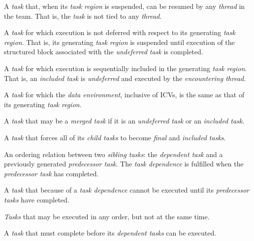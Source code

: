 \glossarydefstart
A \emph{task} that, when its \emph{task region} is suspended, can be resumed 
by any \emph{thread} in the team. That is, the \emph{task} is not tied to 
any \emph{thread}.
\glossarydefend

\glossarydefstart
A \emph{task} for which execution is not deferred with respect to its 
generating \emph{task} \emph{region}. That is, its generating \emph{task}
\emph{region} is suspended until execution of the structured block associated 
with the \emph{undeferred} \emph{task} is completed.
\glossarydefend

\glossarydefstart
A \emph{task} for which execution is sequentially included in the 
generating \emph{task region}. That is, an \emph{included task} is 
\emph{undeferred} and executed by the \emph{encountering thread}.
\glossarydefend

\glossarydefstart
A \emph{task} for which the \emph{data environment}, inclusive of ICVs, 
is the same as that of its generating \emph{task region}.
\glossarydefend

\glossarydefstart
A \emph{task} that may be a \emph{merged task} if it is an 
\emph{undeferred task} or an \emph{included task}.
\glossarydefend

\glossarydefstart
A \emph{task} that forces all of its \emph{child tasks} to become 
\emph{final} and \emph{included tasks}.
\glossarydefend

\glossarydefstart
An ordering relation between two \emph{sibling tasks}: the 
\emph{dependent task} and a previously generated \emph{predecessor task}. 
The \emph{task dependence} is fulfilled when the
\emph{predecessor task} has completed.
\glossarydefend

\begin{samepage}
\glossarydefstart
A \emph{task} that because of a \emph{task dependence} cannot be executed 
until its \emph{predecessor tasks} have completed.
\glossarydefend
\end{samepage}

\glossarydefstart
\emph{Tasks} that may be executed in any order, but not at the same time.
\glossarydefend
\bigskip

\glossarydefstart
A \emph{task} that must complete before its \emph{dependent tasks} can be 
executed.
\glossarydefend

